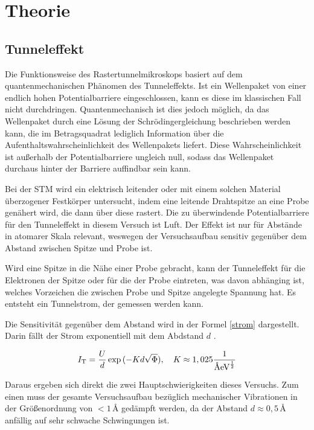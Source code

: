 \section{Theorie}
\subsection{Tunneleffekt}
Die Funktionsweise des Rastertunnelmikroskops basiert auf dem quantenmechanischen Phänomen des Tunneleffekts. Ist ein Wellenpaket von einer endlich hohen Potentialbarriere eingeschlossen, kann es diese im klassischen Fall nicht durchdringen. Quantenmechanisch ist dies jedoch möglich, da das Wellenpaket durch eine Lösung der Schrödingergleichung beschrieben werden kann, die im Betragsquadrat lediglich Information über die Aufenthaltswahrscheinlichkeit des Wellenpakets liefert. Diese Wahrscheinlichkeit ist außerhalb der Potentialbarriere ungleich null, sodass das Wellenpaket durchaus hinter der Barriere auffindbar sein kann. 

\noindent Bei der STM wird ein elektrisch leitender oder mit einem solchen Material überzogener Festkörper untersucht, indem eine leitende Drahtspitze an eine Probe genähert wird, die dann über diese rastert. Die zu überwindende Potentialbarriere für den Tunneleffekt in diesem Versuch ist Luft. Der Effekt ist nur für Abstände in atomarer Skala relevant, weswegen der Versuchsaufbau sensitiv gegenüber dem Abstand zwischen Spitze und Probe ist.

\noindent Wird eine Spitze in die Nähe einer Probe gebracht, kann der Tunneleffekt für die Elektronen der Spitze oder für die der Probe eintreten, was davon abhänging ist, welches Vorzeichen die zwischen Probe und Spitze angelegte Spannung hat. Es entsteht ein Tunnelstrom, der gemessen werden kann.

\noindent Die Sensitivität gegenüber dem Abstand wird in der Formel \eqref{strom}\cite{hopg} dargestellt. Darin fällt der Strom exponentiell mit dem Abdstand \(d\) .

\begin{equation} 
\label{strom}
I_\text{T}=\frac{U}{d}\exp{(-Kd\sqrt{\Phi})},\quad K\approx1,025\frac{1}{\text{\r{A}}\text{eV}^\frac12}
\end{equation}

\noindent Daraus ergeben sich direkt die zwei Hauptschwierigkeiten dieses Versuchs. Zum einen muss der gesamte Versuchsaufbau bezüglich mechanischer Vibrationen in der Größenordnung von \(<1\)\,\r{A} gedämpft werden, da der Abstand \(d\approx0,5\)\,\r{A} \cite{hopg} anfällig auf sehr schwache Schwingungen ist.  


